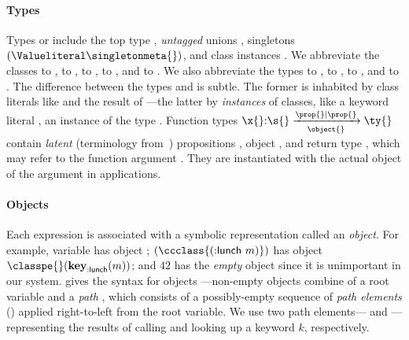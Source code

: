 \paragraph{Types} Types \s{} or \ty{} 
include the top type \Top,
\emph{untagged} unions {\Unionsplice {\overrightarrow{\ty{}}}}, 
singletons ${\Value \singletonmeta{}}$,
and class instances \class{}.
We abbreviate the classes
\Booleanlong{} to \Boolean{}, 
\Keywordlong{} to \Keyword{},
\NumberFull{}  to \Number{},
\StringFull{}  to \String{}, and 
\FileFull{}  to \File{}.
We also abbreviate the types
\EmptyUnion{}     to \Bot{}, 
{\ValueNil}       to \Nil{}, 
{\ValueTrue}      to \True, and
{\ValueFalse} to {\False}.
%
The difference between the types
\Value{\class{}} and \class{} is subtle.
The former is inhabited by class literals like \Keyword{} and the result of 
---the latter by \emph{instances} of classes,
like a keyword literal , an instance of the type \Keyword{}.
%
Function types 
$
{\ArrowOne {\x{}} {\s{}}
             {\ty{}}
             {\filterset {\prop{}} {\prop{}}}
             {\object{}}}
$
contain \emph{latent} (terminology from~\cite{Lucassen88polymorphiceffect}) propositions \prop{}, object \object{}, and return type
\ty{},
which may refer to the function argument \x{}.
They are instantiated with the
actual object of the argument in applications. %

\paragraph{Objects}
Each expression is associated with 
a symbolic representation
called an \emph{object}.
For example,
  variable  has object ;
  $\appexpone{\ccclass{\appexp{\makekw{lunch}}{\makelocal{m}}}}$ has object ${\pth{\classpe{}}{\pth{\keype{\makekw{lunch}}}{\makelocal{m}}}}$; and $42$ has the \emph{empty} object \emptyobject{} since it is unimportant in our system.
%
 gives the syntax for objects \object{}---non-empty objects 
\pth{\pathelem{}}{\x{}} combine of a root variable \x{} and a \emph{path} \pathelem{},
which consists of
a possibly-empty sequence of \emph{path elements} (\pesyntax{}) applied right-to-left from the root variable.
We use two path elements---{\classpe{}} and {}---representing the results
of calling \classconst{} and looking up a keyword $k$, respectively.

